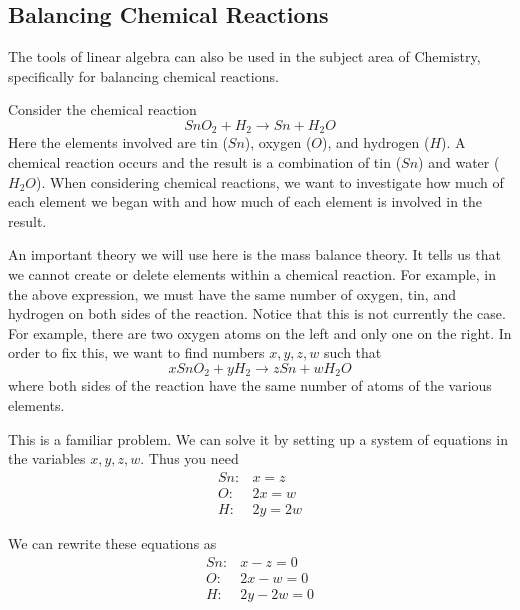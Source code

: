\subsection{Balancing Chemical Reactions}

The tools of linear algebra can also be used in the subject area of Chemistry, specifically for balancing chemical reactions. 

Consider the chemical reaction 
\begin{equation*}
SnO_{2}+H_{2}\rightarrow Sn+H_{2}O
\end{equation*}
Here the elements involved are tin ($Sn$), oxygen ($O$), and hydrogen ($H$). A
chemical reaction occurs and the result is a combination of tin ($Sn$) and water ($H_{2}O$). When considering
chemical reactions, we want to investigate how much of each element we began with and how much of each element is involved in the result.

An important theory we will use here is the mass balance theory. It tells us that we cannot create or delete 
elements within a chemical reaction. For example, in the above expression, we must have the same number of oxygen, tin,
and hydrogen on both sides of the reaction. Notice that this is not currently the case.
 For example, there are two oxygen atoms on the left and only one
on the right. In order to fix this, we want to find numbers $x,y,z,w$ such that 
\begin{equation*}
xSnO_{2}+yH_{2}\rightarrow zSn+wH_{2}O
\end{equation*}
where both sides of the reaction have the same number of atoms of the various elements. 

This is a familiar problem. We can solve it by setting up a system of equations 
in the variables $x,y,z,w$. Thus you need 
\begin{equation*}
\begin{array}{cl}
Sn: & x=z \\ 
O: & 2x=w \\ 
H: & 2y=2w
\end{array}
\end{equation*}

We can rewrite these equations as
\begin{equation*}
\begin{array}{cl}
Sn: & x - z = 0 \\ 
O: & 2x - w = 0 \\ 
H: & 2y - 2w = 0 
\end{array}
\end{equation*}

